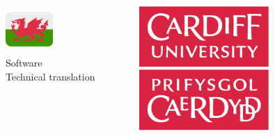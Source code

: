 \documentclass{beamer}
\begin{document}
\begin{frame}
  \begin{columns}
    \begin{column}{0.5\textwidth}
      \begin{center}
        \includegraphics[width=0.4\textwidth]{cy}\\
        \vspace{10mm}
        Software\\
        \vspace{10mm}
        Technical translation\\
      \end{center}
    \end{column}
    \begin{column}{0.5\textwidth}
      \begin{center}
        \begin{center}
          \includegraphics[width=0.6\textwidth]{cflogo}
        \end{center}
        \vspace{7mm}
\end{center}
\end{column}
\end{columns}
\end{frame}
\end{document}
